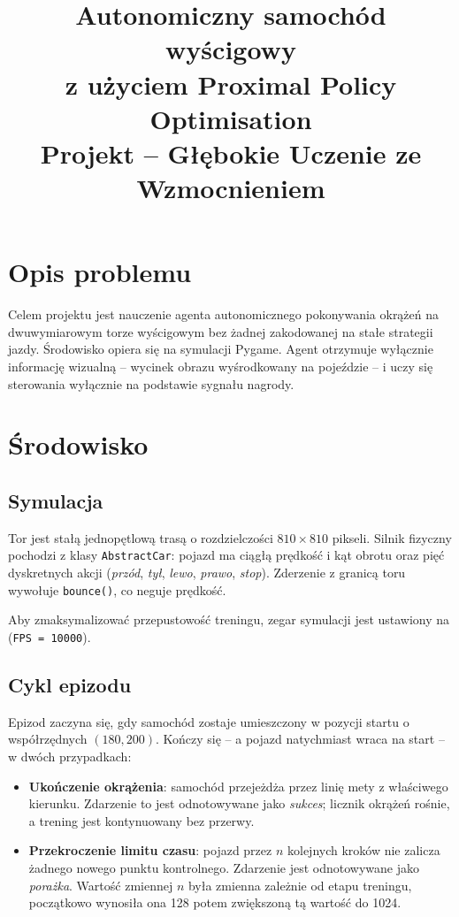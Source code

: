 \documentclass[12pt,a4paper,twocolumn]{article}
\title{\textbf{Autonomiczny samochód wyścigowy\\z użyciem Proximal Policy Optimisation}\\
       \large Projekt -- Głębokie Uczenie ze Wzmocnieniem}
\author{}
\date{}
\begin{document}
\maketitle

\section{Opis problemu}

Celem projektu jest nauczenie agenta autonomicznego pokonywania okrążeń na dwuwymiarowym torze wyścigowym bez żadnej zakodowanej na stałe strategii jazdy.
Środowisko opiera się na symulacji Pygame. Agent otrzymuje wyłącznie informację wizualną -- wycinek obrazu wyśrodkowany na pojeździe -- i uczy się sterowania wyłącznie na podstawie sygnału nagrody.

\section{Środowisko}

\subsection{Symulacja}

Tor jest stałą jednopętlową trasą o rozdzielczości $810 \times 810$ pikseli.
Silnik fizyczny pochodzi z klasy \texttt{AbstractCar}: pojazd ma ciągłą prędkość i kąt obrotu oraz pięć dyskretnych akcji (\textit{przód}, \textit{tył}, \textit{lewo}, \textit{prawo}, \textit{stop}).
Zderzenie z granicą toru wywołuje \texttt{bounce()}, co neguje prędkość.

Aby zmaksymalizować przepustowość treningu, zegar symulacji jest ustawiony na (\texttt{FPS = 10000}).

\subsection{Cykl epizodu}

Epizod zaczyna się, gdy samochód zostaje umieszczony w pozycji startu o współrzędnych $(180, 200)$.
Kończy się -- a pojazd natychmiast wraca na start -- w dwóch przypadkach:

\begin{itemize}
  \item \textbf{Ukończenie okrążenia}: samochód przejeżdża przez linię mety z właściwego kierunku. Zdarzenie to jest odnotowywane jako \emph{sukces}; licznik okrążeń rośnie, a trening jest kontynuowany bez przerwy.
  \item \textbf{Przekroczenie limitu czasu}: pojazd przez $n$ kolejnych kroków nie zalicza żadnego nowego punktu kontrolnego. Zdarzenie jest odnotowywane jako \emph{porażka}. Wartość zmiennej $n$ była zmienna zależnie od etapu treningu, początkowo wynosiła ona 128 potem zwiększoną tą wartość do 1024.
\end{itemize}
\end{document}
